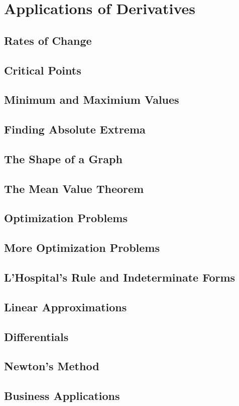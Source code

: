 \documentclass[../satmath.tex]{subfiles}
\begin{document}
\chapter{Applications of Derivatives}
\section{Rates of Change}
\section{Critical Points}
\section{Minimum and Maximium Values}
\section{Finding Absolute Extrema}
\section{The Shape of a Graph}
\section{The Mean Value Theorem}
\section{Optimization Problems}
\section{More Optimization Problems}
\section{L'Hospital's Rule and Indeterminate Forms}
\section{Linear Approximations}
\section{Differentials}
\section{Newton's Method}
\section{Business Applications}
\end{document}
